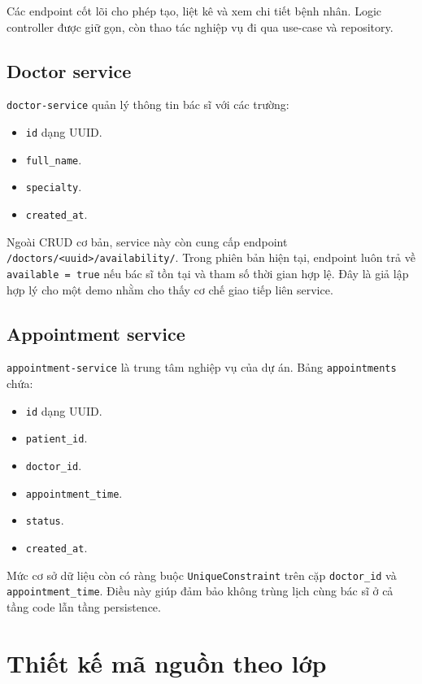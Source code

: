 \documentclass[12pt,a4paper]{article}
\begin{document}
Các endpoint cốt lõi cho phép tạo, liệt kê và xem chi tiết bệnh nhân. Logic controller được giữ gọn, còn thao tác nghiệp vụ đi qua use-case và repository.

\subsection{Doctor service}
\texttt{doctor-service} quản lý thông tin bác sĩ với các trường:
\begin{itemize}[leftmargin=1.5em]
  \item \texttt{id} dạng UUID.
  \item \texttt{full\_name}.
  \item \texttt{specialty}.
  \item \texttt{created\_at}.
\end{itemize}

Ngoài CRUD cơ bản, service này còn cung cấp endpoint \texttt{/doctors/<uuid>/availability/}. Trong phiên bản hiện tại, endpoint luôn trả về \texttt{available = true} nếu bác sĩ tồn tại và tham số thời gian hợp lệ. Đây là giả lập hợp lý cho một demo nhằm cho thấy cơ chế giao tiếp liên service.

\subsection{Appointment service}
\texttt{appointment-service} là trung tâm nghiệp vụ của dự án. Bảng \texttt{appointments} chứa:
\begin{itemize}[leftmargin=1.5em]
  \item \texttt{id} dạng UUID.
  \item \texttt{patient\_id}.
  \item \texttt{doctor\_id}.
  \item \texttt{appointment\_time}.
  \item \texttt{status}.
  \item \texttt{created\_at}.
\end{itemize}

Mức cơ sở dữ liệu còn có ràng buộc \texttt{UniqueConstraint} trên cặp \texttt{doctor\_id} và \texttt{appointment\_time}. Điều này giúp đảm bảo không trùng lịch cùng bác sĩ ở cả tầng code lẫn tầng persistence.

\section{Thiết kế mã nguồn theo lớp}
\end{document}

